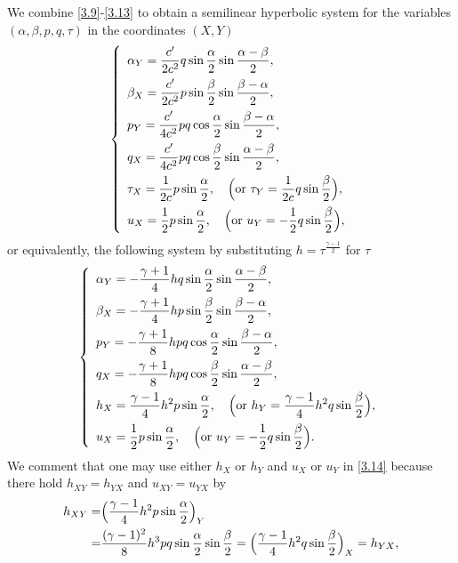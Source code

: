 \documentclass[11pt,reqno]{article}
\newcommand{\dps}{\displaystyle}
\newcommand{\fr}{\frac}
\numberwithin{equation}{section}
\begin{document}
We combine \eqref{3.9}-\eqref{3.13} to obtain a semilinear hyperbolic system for the variables $(\alpha, \beta, p, q, \tau)$ in the coordinates $(X,Y)$
\begin{align}\label{3.14a}
\left\{
\begin{array}{l}
\dps \alpha_Y=\fr{c'}{2c^2}q\sin\fr{\alpha}{2}\sin\fr{\alpha-\beta}{2}, \\[8pt]
\dps \beta_X=\fr{c'}{2c^2}p\sin\fr{\beta}{2}\sin\fr{\beta-\alpha}{2},\\[8pt]
\dps p_Y=\fr{c'}{4c^2}pq\cos\fr{\alpha}{2}\sin\fr{\beta-\alpha}{2},\\[8pt]
\dps q_X=\fr{c'}{4c^2}pq\cos\fr{\beta}{2}\sin\fr{\alpha-\beta}{2},\\[8pt]
\dps \tau_X=\fr{1}{2c}p\sin\fr{\alpha}{2}, \quad \Big({\rm or}\ \tau_Y=\fr{1}{2c}q\sin\fr{\beta}{2}\Big), \\[8pt]
\dps u_X=\fr{1}{2}p\sin\fr{\alpha}{2}, \quad \Big({\rm or}\ u_Y=-\fr{1}{2}q\sin\fr{\beta}{2}\Big),
\end{array}
\right.
\end{align}
or equivalently, the following system by substituting $h=\tau^{\fr{\gamma-1}{2}}$ for $\tau$
\begin{align}\label{3.14}
\left\{
\begin{array}{l}
\dps \alpha_Y=-\fr{\gamma+1}{4}hq\sin\fr{\alpha}{2}\sin\fr{\alpha-\beta}{2}, \\[8pt]
\dps \beta_X=-\fr{\gamma+1}{4}hp\sin\fr{\beta}{2}\sin\fr{\beta-\alpha}{2},\\[8pt]
\dps p_Y=-\fr{\gamma+1}{8}hpq\cos\fr{\alpha}{2}\sin\fr{\beta-\alpha}{2},\\[8pt]
\dps q_X=-\fr{\gamma+1}{8}hpq\cos\fr{\beta}{2}\sin\fr{\alpha-\beta}{2},\\[8pt]
\dps h_X=\fr{\gamma-1}{4}h^2p\sin\fr{\alpha}{2}, \quad \Big({\rm or}\ h_Y=\fr{\gamma-1}{4}h^2q\sin\fr{\beta}{2}\Big), \\[8pt]
\dps u_X=\fr{1}{2}p\sin\fr{\alpha}{2}, \quad \Big({\rm or}\ u_Y=-\fr{1}{2}q\sin\fr{\beta}{2}\Big).
\end{array}
\right.
\end{align}
We comment that one may use either $h_X$ or $h_Y$ and $u_X$ or $u_Y$ in \eqref{3.14} because there hold $h_{XY}=h_{YX}$ and $u_{XY}=u_{YX}$ by
\begin{align}\label{3.15}
h_{XY}=&\Big(\fr{\gamma-1}{4}h^2p\sin\fr{\alpha}{2}\Big)_Y \notag \\
=& \fr{(\gamma-1)^2}{8}h^3pq\sin\fr{\alpha}{2}\sin\fr{\beta}{2} =\Big(\fr{\gamma-1}{4}h^2q\sin\fr{\beta}{2}\Big)_X=h_{YX},
\end{align}
\end{document}
